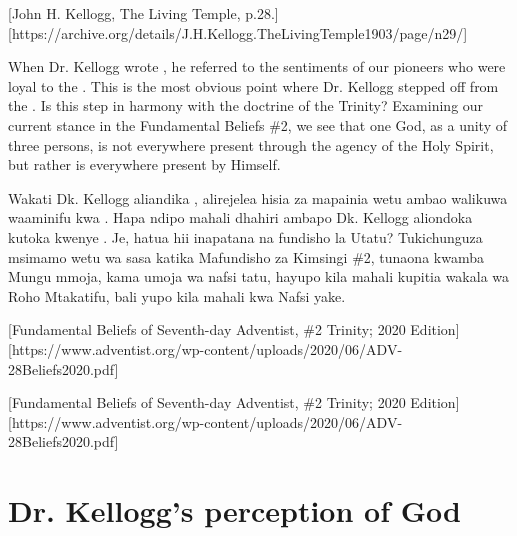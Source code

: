 [John H. Kellogg, The Living Temple, p.28.][https://archive.org/details/J.H.Kellogg.TheLivingTemple1903/page/n29/]


When Dr. Kellogg wrote , he referred to the sentiments of our pioneers who were loyal to the . This is the most obvious point where Dr. Kellogg stepped off from the . Is this step in harmony with the doctrine of the Trinity? Examining our current stance in the Fundamental Beliefs \#2, we see that one God, as a unity of three persons, is not everywhere present through the agency of the Holy Spirit, but rather is everywhere present by Himself.


Wakati Dk. Kellogg aliandika , alirejelea hisia za mapainia wetu ambao walikuwa waaminifu kwa . Hapa ndipo mahali dhahiri ambapo Dk. Kellogg aliondoka kutoka kwenye . Je, hatua hii inapatana na fundisho la Utatu? Tukichunguza msimamo wetu wa sasa katika Mafundisho za Kimsingi \#2, tunaona kwamba Mungu mmoja, kama umoja wa nafsi tatu, hayupo kila mahali kupitia wakala wa Roho Mtakatifu, bali yupo kila mahali kwa Nafsi yake.


[Fundamental Beliefs of Seventh-day Adventist, \#2 Trinity; 2020 Edition][https://www.adventist.org/wp-content/uploads/2020/06/ADV-28Beliefs2020.pdf]


[Fundamental Beliefs of Seventh-day Adventist, \#2 Trinity; 2020 Edition][https://www.adventist.org/wp-content/uploads/2020/06/ADV-28Beliefs2020.pdf]


\section*{Dr. Kellogg's perception of God}


